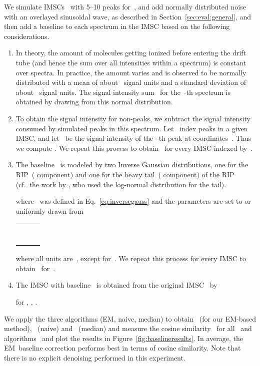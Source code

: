 \documentclass{article}
\begin{document}
We simulate IMSCs~ with 5--10 peaks for~, and add normally distributed noise with an overlayed sinusoidal wave, as described in Section~\ref{sec:eval:general}, and then add a baseline to each spectrum in the IMSC based on the following considerations.
\begin{enumerate}
\item In theory, the amount of molecules getting ionized before entering the drift tube (and hence the sum over all intensities within a spectrum) is constant over spectra.
In practice, the amount varies and is observed to be normally distributed with a mean of about~ signal units and a standard deviation of about~ signal units.
The signal intensity sum~ for the~-th spectrum is obtained by drawing from this normal distribution.
\item To obtain the signal intensity for non-peaks, we subtract the signal intensity consumed by simulated peaks in this spectrum. 
Let~ index peaks in a given IMSC, and let~ be the signal intensity of the~-th peak at coordinates~.
Thus we compute .
We repeat this process to obtain~ for every IMSC indexed by~.
\item The baseline~ is modeled by two Inverse Gaussian distributions, one for the RIP~( component) and one for the heavy tail~( component) of the RIP (cf.\ the work by \cite{bader2008preprocessing}, who used the log-normal distribution for the tail).

where~ was defined in Eq.~\eqref{eq:inversegauss} and the parameters are set to or uniformly drawn from
\begin{center}\begin{tabular}{r@{ }c@{ }l}
 &  & \\
 &  & \\
 &  & \\
 &  &  \\
 &  & \\
 &  & \\
 &  & \\
\end{tabular}\end{center}
where all units are~, except for~. We repeat this process for every IMSC to obtain~ for~.
\item The IMSC with baseline~ is obtained from the original IMSC~ by

for , , .
\end{enumerate}
We apply the three algorithms (EM, naive, median) to obtain~ (for our EM-based method),~ (naive) and~ (median) and measure the cosine similarity~ for all~ and algorithms~ and plot the results in Figure~\ref{fig:baselineresults}.
In average, the EM~baseline correction performs best in terms of cosine similarity.
Note that there is no explicit denoising performed in this experiment.
\end{document}
